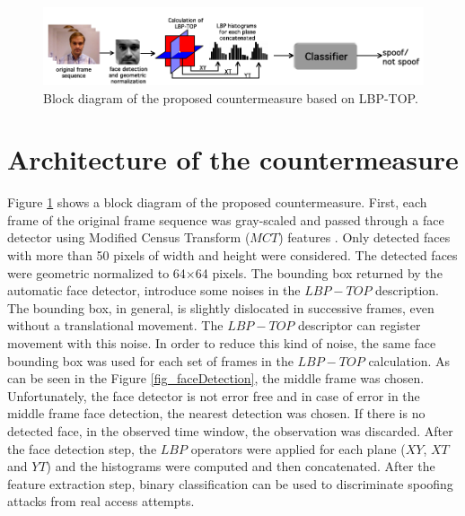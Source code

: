 
\begin{figure}[!htb]
\begin{center}
\includegraphics [width=16cm] {images/proposed_countermeasure/countermeasure_2.png}
\caption[Block diagram of the proposed countermeasure based on LBP-TOP]{Block diagram of the proposed countermeasure based on LBP-TOP.} \label{fig_countermeasure}
\end{center}
\end{figure}

\section{Architecture of the countermeasure}
\label{sec_proposed_counter}

Figure \ref{fig_countermeasure} shows a block diagram of the proposed countermeasure. First, each frame of the original frame sequence was gray-scaled and passed through a face detector using Modified Census Transform ($MCT$) features \citep{froba2004face}. Only detected faces with more than 50 pixels of width and height were considered. The detected faces were geometric normalized to 64$\times$64 pixels. The bounding box returned by the automatic face detector, introduce some noises in the $LBP-TOP$ description. The bounding box, in general, is slightly dislocated in successive frames, even without a translational movement. The $LBP-TOP$ descriptor can register movement with this noise. In order to reduce this kind of noise, the same face bounding box was used for each set of frames in the $LBP-TOP$ calculation. As can be seen in the Figure \ref{fig_faceDetection}, the middle frame was chosen. Unfortunately, the face detector is not error free and in case of error in the middle frame face detection, the nearest detection was chosen. If there is no detected face, in the observed time window, the observation was discarded. After the face detection step, the $LBP$ operators were applied for each plane ($XY$, $XT$ and $YT$) and the histograms were computed and then concatenated. After the feature extraction step, binary classification can be used to discriminate spoofing attacks from real access attempts.


